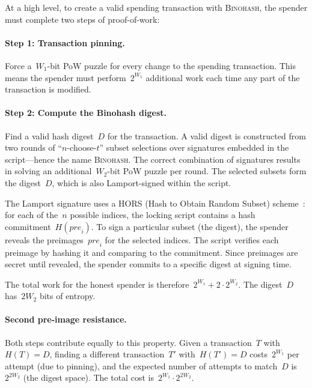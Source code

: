 \documentclass[11pt, a4paper]{article}
\begin{document}
\medskip

At a high level, to create a valid spending transaction with \textsc{Binohash}, the spender must complete two steps of proof-of-work:

\paragraph{Step 1: Transaction pinning.}
Force a~$W_1$-bit PoW puzzle for every change to the spending transaction. This means the spender must perform~$2^{W_1}$ additional work each time any part of the transaction is modified.

\paragraph{Step 2: Compute the Binohash digest.}
Find a valid hash digest~$D$ for the transaction. A valid digest is constructed from two rounds of ``$n$-choose-$t$'' subset selections over signatures embedded in the script---hence the name \textsc{Binohash}. The correct combination of signatures results in solving an additional~$W_2$-bit PoW puzzle per round. The selected subsets form the digest~$D$, which is also Lamport-signed within the script.

The Lamport signature uses a HORS (Hash to Obtain Random Subset) scheme~\cite{reyzin2002}: for each of the~$n$ possible indices, the locking script contains a hash commitment~$H(\mathit{pre}_i)$. To sign a particular subset (the digest), the spender reveals the preimages~$\mathit{pre}_i$ for the selected indices. The script verifies each preimage by hashing it and comparing to the commitment. Since preimages are secret until revealed, the spender commits to a specific digest at signing time.

\medskip

The total work for the honest spender is therefore~$2^{W_1} + 2 \cdot 2^{W_2}$. The digest~$D$ has~$2 W_2$ bits of entropy.

\paragraph{Second pre-image resistance.}
Both steps contribute equally to this property. Given a transaction~$T$ with~$H(T) = D$, finding a different transaction~$T'$ with~$H(T') = D$ costs~$2^{W_1}$ per attempt (due to pinning), and the expected number of attempts to match~$D$ is~$2^{2 W_2}$ (the digest space). The total cost is~$2^{W_1} \cdot 2^{2 W_2}$.
\end{document}
